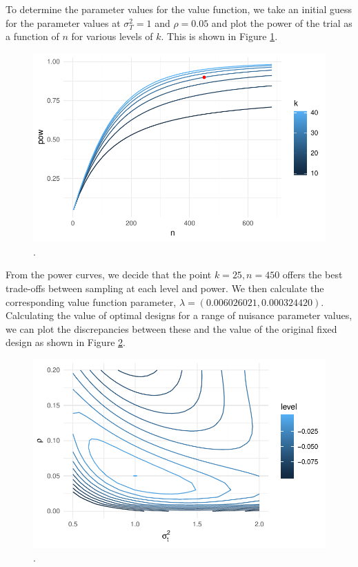 \documentclass[sagev]{sagej}
\begin{document}
To determine the parameter values for the value function, we take an initial guess for the parameter values at $\sigma_T^2 = 1$ and $\rho = 0.05$ and plot the power of the trial as a function of $n$ for various levels of $k$. This is shown in Figure \ref{fig:cluster_pow}.

\begin{figure}
\centering
\includegraphics[scale=0.8]{./figures/cluster_pow}
\caption{.}
\label{fig:cluster_pow}
\end{figure}

From the power curves, we decide that the point $k=25, n=450$ offers the best trade-offs between sampling at each level and power. We then calculate the corresponding value function parameter, $\lambda = (0.006026021, 0.000324420)$. Calculating the value of optimal designs for a range of nuisance parameter values, we can plot the discrepancies between these and the value of the original fixed design as shown in Figure \ref{fig:cluster_disc}.

\begin{figure}
\centering
\includegraphics[scale=0.8]{./figures/cluster_disc}
\caption{.}
\label{fig:cluster_disc}
\end{figure}
\end{document}
